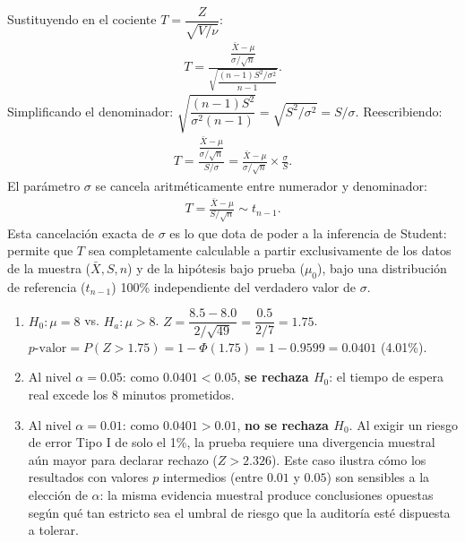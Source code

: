 \begin{solproblema}[prob:6c535e4]
	Sustituyendo en el cociente $T = \dfrac{Z}{\sqrt{V/\nu}}$:
	\begin{align}
		T = \frac{\dfrac{\bar{X}-\mu}{\sigma/\sqrt{n}}}{\sqrt{\dfrac{(n-1)S^2/\sigma^2}{n-1}}}.
	\end{align}
	Simplificando el denominador: $\sqrt{\dfrac{(n-1)S^2}{\sigma^2(n-1)}} = \sqrt{S^2/\sigma^2} = S/\sigma$. Reescribiendo:
	\begin{align}
		T = \frac{\dfrac{\bar{X}-\mu}{\sigma/\sqrt{n}}}{S/\sigma} = \frac{\bar{X}-\mu}{\sigma/\sqrt{n}}\times\frac{\sigma}{S}.
	\end{align}
	El parámetro $\sigma$ se cancela aritméticamente entre numerador y denominador:
	\begin{align}
		T = \frac{\bar{X}-\mu}{S/\sqrt{n}} \sim t_{n-1}.
	\end{align}
	Esta cancelación exacta de $\sigma$ es lo que dota de poder a la inferencia de Student: permite que $T$ sea completamente calculable a partir exclusivamente de los datos de la muestra ($\bar{X}, S, n$) y de la hipótesis bajo prueba ($\mu_0$), bajo una distribución de referencia ($t_{n-1}$) 100\% independiente del verdadero valor de $\sigma$.
\end{solproblema}

\begin{solproblema}[prob:a9a27c5]
	\begin{enumerate}
		\item $H_0:\mu=8$ vs. $H_a:\mu>8$. $Z = \dfrac{8.5-8.0}{2/\sqrt{49}} = \dfrac{0.5}{2/7} = 1.75$. $p\text{-valor} = P(Z>1.75) = 1-\Phi(1.75) = 1-0.9599 = 0.0401$ (4.01\%).
		\item Al nivel $\alpha=0.05$: como $0.0401<0.05$, \textbf{se rechaza $H_0$}: el tiempo de espera real excede los 8 minutos prometidos.
		\item Al nivel $\alpha=0.01$: como $0.0401>0.01$, \textbf{no se rechaza $H_0$}. Al exigir un riesgo de error Tipo I de solo el 1\%, la prueba requiere una divergencia muestral aún mayor para declarar rechazo ($Z>2.326$). Este caso ilustra cómo los resultados con valores $p$ intermedios (entre $0.01$ y $0.05$) son sensibles a la elección de $\alpha$: la misma evidencia muestral produce conclusiones opuestas según qué tan estricto sea el umbral de riesgo que la auditoría esté dispuesta a tolerar.
	\end{enumerate}
\end{solproblema}


